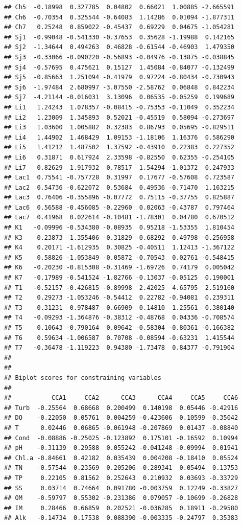 \documentclass[
]{book}
\begin{document}
\begin{verbatim}
## Ch5  -0.18998  0.327785  0.04802  0.66021  1.00885 -2.665591
## Ch6  -0.70354  0.325544 -0.64083  1.14286  0.01094 -1.877311
## Ch7   0.25248  0.859022 -0.45437  0.69229  0.04675 -1.054281
## Sj1  -0.99048 -0.541330 -0.37653  0.35628 -1.19988  0.142165
## Sj2  -1.34644  0.494263  0.46828 -0.61544 -0.46903  1.479350
## Sj3  -0.33066 -0.090220 -0.56893 -0.04976 -0.13875 -0.038845
## Sj4  -0.57695  0.475621  0.15127  1.45084 -0.84077 -0.132499
## Sj5  -0.85663  1.251094 -0.41979  0.97224 -0.80434 -0.730943
## Sj6  -1.97484  2.680997 -3.07550 -2.58762  0.06848  0.842234
## Sj7  -4.21144 -0.016031  3.13096  0.06535 -0.05259  0.199689
## Li1   1.24243  1.078357 -0.08415 -0.75353 -0.11049  0.352234
## Li2   1.23009  1.345893  0.52021 -0.45519  0.58094 -0.273697
## Li3   1.03600  1.005882  0.32383  0.86793  0.05695 -0.829511
## Li4   1.44902  1.468429  1.09153 -1.18106  1.16376  0.586290
## Li5   1.41212  1.487502  1.37592 -0.43910  0.22383  0.227352
## Li6   0.31871  0.617924  2.33598 -0.82550  0.62355 -0.254105
## Li7   0.82629  1.917932  0.78517  1.54294 -1.01372  0.247933
## Lac1  0.75541 -0.757728  0.31997  0.17677 -0.57608  0.723587
## Lac2  0.54736 -0.622072  0.53684  0.49536 -0.71470  1.163215
## Lac3  0.76406 -0.355896 -0.07772  0.75115 -0.37755  0.825887
## Lac6  0.56588 -0.456085 -0.22960  0.02063 -0.43787  0.797464
## Lac7  0.41968  0.022614 -0.10481 -1.78301  0.04780  0.670512
## K1   -0.09996 -0.534380 -0.08935  0.95218 -1.53355  1.810454
## K3    0.23873 -1.355406 -0.31829 -0.68292  0.49798 -0.256958
## K4    0.20171 -1.612935  0.30825 -0.40511  1.12413 -1.367122
## K5    0.58826 -1.053849 -0.05872 -0.70543  0.02761 -0.548415
## K6   -0.20230 -0.815308 -0.31469 -1.69726  0.74179  0.005042
## K7   -0.17989 -0.541524 -1.82766 -0.13037 -0.05125  0.190001
## T1   -0.52157 -0.426815 -0.89998  2.42025  4.65795  2.519160
## T2    0.29273 -1.053246 -0.54412  0.22782 -0.94081  0.239311
## T3    0.31231 -0.978487 -0.66909  0.14810 -1.25561  0.380140
## T4   -0.09293 -1.364876 -0.38312 -0.48768  0.04336 -0.708574
## T5    0.10643 -0.790164  0.09642 -0.58304 -0.80361 -0.166382
## T6    0.59634 -1.006587  0.70708 -0.08594 -0.63231  1.415544
## T7   -0.36478 -1.119223  0.94380 -1.73478  0.84377 -0.791904
## 
## 
## Biplot scores for constraining variables
## 
##           CCA1     CCA2      CCA3      CCA4     CCA5     CCA6
## Turb  -0.25564  0.68668  0.200499  0.140198  0.05446 -0.42916
## DO    -0.22050  0.05761  0.004259 -0.423606  0.10599 -0.35042
## T      0.02446  0.06865 -0.061948 -0.207869  0.01437 -0.08840
## Cond  -0.08886 -0.25025 -0.123892  0.175101 -0.16592  0.10994
## pH    -0.31139  0.29588  0.055242 -0.041248 -0.09994  0.01941
## Chl.a -0.84661  0.42182  0.035439  0.004208 -0.18410  0.05524
## TN    -0.57544  0.23569  0.205206 -0.289341  0.05494  0.13753
## TP     0.22105  0.81562  0.252643  0.210932  0.03693 -0.33729
## SS     0.03714  0.74664  0.091780 -0.003759  0.12249 -0.33827
## OM    -0.59797  0.55302 -0.231386  0.079057 -0.10699 -0.26828
## IM     0.28466  0.66859  0.202521 -0.036285  0.18911 -0.29580
## Alk   -0.14734  0.17538  0.088390 -0.003335 -0.24797  0.35383
\end{verbatim}
\end{document}
